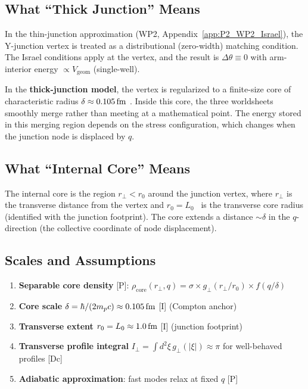 \subsection{What ``Thick Junction'' Means}

In the thin-junction approximation (WP2,
Appendix~\ref{app:P2_WP2_Israel}), the Y-junction vertex is treated as
a distributional (zero-width) matching condition. The Israel conditions
apply at the vertex, and the result is $\Delta\theta \equiv 0$ with
arm-interior energy $\propto V_{\mathrm{geom}}$ (single-well).

In the \textbf{thick-junction model}, the vertex is regularized to a
finite-size core of characteristic radius $\delta \approx 0.105\,\mathrm{fm}$ \tagI.
Inside this core, the three worldsheets smoothly merge rather than
meeting at a mathematical point. The energy stored in this merging
region depends on the stress configuration, which changes when the
junction node is displaced by $q$.

\subsection{What ``Internal Core'' Means}

The internal core is the region $r_\perp < r_0$ around the junction
vertex, where $r_\perp$ is the transverse distance from the vertex and
$r_0 = L_0$ \tagI\ is the transverse core radius (identified with the
junction footprint). The core extends a distance $\sim \delta$ in the
$q$-direction (the collective coordinate of node displacement).

\subsection{Scales and Assumptions}

\begin{assumptionbox}[title=N7 Model Assumptions]
\begin{enumerate}
    \item \textbf{Separable core density} [P]:
          $\rho_{\mathrm{core}}(r_\perp, q) = \sigma \times
           g_\perp(r_\perp / r_0) \times f(q/\delta)$
    \item \textbf{Core scale} $\delta = \hbar/(2m_p c) \approx 0.105\,\mathrm{fm}$
          [I] (Compton anchor)
    \item \textbf{Transverse extent} $r_0 = L_0 \approx 1.0\,\mathrm{fm}$ [I]
          (junction footprint)
    \item \textbf{Transverse profile integral}
          $I_\perp = \int d^2\xi\, g_\perp(|\xi|) \approx \pi$
          for well-behaved profiles [Dc]
    \item \textbf{Adiabatic approximation}: fast modes relax at
          fixed $q$ [P]
\end{enumerate}
\end{assumptionbox}

